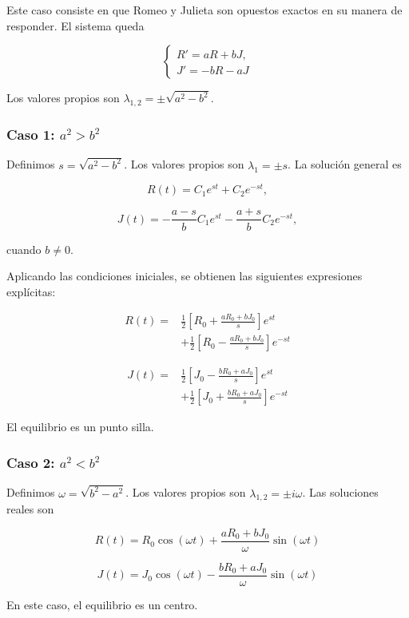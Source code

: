 \documentclass[10pt]{article}
\numberwithin{equation}{section}
\begin{document}
Este caso consiste en que Romeo y Julieta son opuestos exactos en su manera de responder.
El sistema queda

\[
\boxed{
\begin{cases}
R'=aR+bJ,\\
J'=-bR-aJ
\end{cases}
}
\]

Los valores propios son $\lambda_{1,2}=\pm\sqrt{a^2-b^2}$.

\subsubsection{Caso 1: $a^2>b^2$}

Definimos $s=\sqrt{a^2-b^2}$. Los valores propios son $\lambda_1= \pm s$. La solución general es

\[
R(t)=C_1e^{st}+C_2e^{-st},
\]

\[
J(t)=
-\frac{a-s}{b}C_1e^{st}
-\frac{a+s}{b}C_2e^{-st},
\]

cuando $b\neq 0$.

Aplicando las condiciones iniciales, se obtienen las
siguientes expresiones explícitas:

\[
\boxed{
\begin{aligned}
R(t)={}&
\frac12\left[
R_0+\frac{aR_0+bJ_0}{s}
\right]e^{st}\\
&+
\frac12\left[
R_0-\frac{aR_0+bJ_0}{s}
\right]e^{-st}
\end{aligned}
}
\]

\[
\boxed{
\begin{aligned}
J(t)={}&
\frac12\left[
J_0-\frac{bR_0+aJ_0}{s}
\right]e^{st}\\
&+
\frac12\left[
J_0+\frac{bR_0+aJ_0}{s}
\right]e^{-st}
\end{aligned}
}
\]

El equilibrio es un punto silla.

\subsubsection{Caso 2: $a^2<b^2$}

Definimos $\omega=\sqrt{b^2-a^2}$. Los valores propios son $\lambda_{1,2}=\pm i\omega$. Las soluciones reales son

\[
\boxed{
R(t)=R_0\cos(\omega t)
+
\frac{aR_0+bJ_0}{\omega}
\sin(\omega t)
}
\]

\[
\boxed{
J(t)=J_0\cos(\omega t)
-
\frac{bR_0+aJ_0}{\omega}
\sin(\omega t)
}
\]

En este caso, el equilibrio es un centro.
\end{document}
